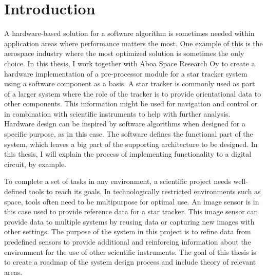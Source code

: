\documentclass[12pt]{report}
\begin{document}
\chapter{Introduction}

A hardware-based solution for a software algorithm is sometimes needed within application areas where performance matters the most. One example of this is the aerospace industry where the most optimized solution is sometimes the only choice. In this thesis, I work together with Aboa Space Research Oy to create a hardware implementation of a pre-processor module for a star tracker system using a software component as a basis. A star tracker is commonly used as part of a larger system where the role of the tracker is to provide orientational data to other components. This information might be used for navigation and control or in combination with scientific instruments to help with further analysis.
Hardware design can be inspired by software algorithms when designed for a specific purpose, as in this case. The software defines the functional part of the system, which leaves a big part of the supporting architecture to be designed. In this thesis, I will explain the process of implementing functionality to a digital circuit, by example.



\par

To complete a set of tasks in any environment, a scientific project needs well-defined tools to reach its goals. In technologically restricted environments such as space, tools often need to be multipurpose for optimal use. An image sensor is in this case used to provide reference data for a star tracker. This image sensor can provide data to multiple systems by reusing data or capturing new images with other settings. The purpose of the system in this project is to refine data from predefined sensors to provide additional and reinforcing information about the environment for the use of other scientific instruments. The goal of this thesis is to create a roadmap of the system design process and include theory of relevant areas.
\end{document}

